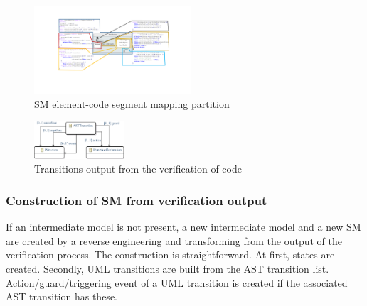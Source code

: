 \begin{figure}
\centering
\includegraphics[clip, trim=5.2cm 5.1cm 0.1cm 2.8cm, width=0.52\textwidth]{figures/backwardmapping.pdf}
\caption{SM element-code segment mapping partition} 
\label{fig:partition}
\end{figure}

\begin{figure}
\centering
\includegraphics[clip, trim=0cm 0.06cm 0.0cm 0.08cm, width=0.3\textwidth]{figures/asttransition}
\caption{Transitions output from the verification of code} 
\label{fig:transitions}
\end{figure}

\subsubsection{Construction of SM from verification output}
If an intermediate model is not present, a new intermediate model and a new SM are created by a reverse engineering and transforming from the output of the verification process. The construction is straightforward. At first, states are created. Secondly, UML transitions are built from the AST transition list. Action/guard/triggering event of a UML transition is created if the associated AST transition has these.

